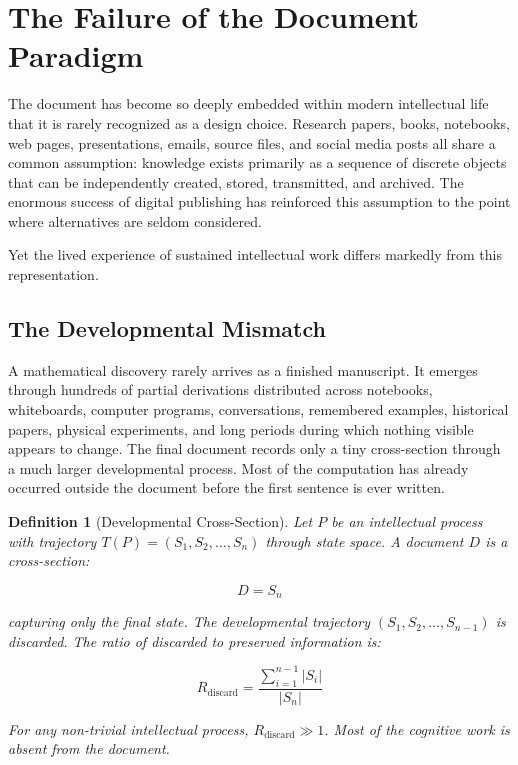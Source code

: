 \documentclass[12pt,oneside]{article}
\newtheorem{definition}{Definition}[section]
\theoremstyle{remark}
\begin{document}

\section{The Failure of the Document Paradigm}

The document has become so deeply embedded within modern intellectual life that it is rarely recognized as a design choice. Research papers, books, notebooks, web pages, presentations, emails, source files, and social media posts all share a common assumption: knowledge exists primarily as a sequence of discrete objects that can be independently created, stored, transmitted, and archived. The enormous success of digital publishing has reinforced this assumption to the point where alternatives are seldom considered.

Yet the lived experience of sustained intellectual work differs markedly from this representation.

\subsection{The Developmental Mismatch}

A mathematical discovery rarely arrives as a finished manuscript. It emerges through hundreds of partial derivations distributed across notebooks, whiteboards, computer programs, conversations, remembered examples, historical papers, physical experiments, and long periods during which nothing visible appears to change. The final document records only a tiny cross-section through a much larger developmental process. Most of the computation has already occurred outside the document before the first sentence is ever written.

\begin{definition}[Developmental Cross-Section]
Let $P$ be an intellectual process with trajectory $T(P) = (S_1, S_2, \ldots, S_n)$ through state space. A document $D$ is a cross-section:

\begin{equation}
D = S_n
\end{equation}

capturing only the final state. The developmental trajectory $(S_1, S_2, \ldots, S_{n-1})$ is discarded. The ratio of discarded to preserved information is:

\begin{equation}
R_{\text{discard}} = \frac{\sum_{i=1}^{n-1} |S_i|}{|S_n|}
\end{equation}

For any non-trivial intellectual process, $R_{\text{discard}} \gg 1$. Most of the cognitive work is absent from the document.
\end{definition}
\end{document}
